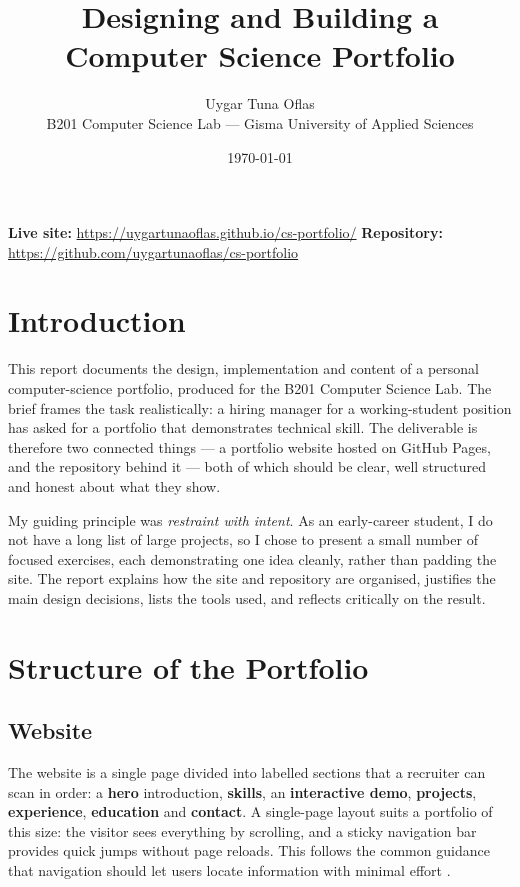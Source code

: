 \documentclass[11pt,a4paper]{article}
\title{\vspace{-1.2cm}\textbf{Designing and Building a Computer Science Portfolio}}
\author{Uygar Tuna Oflas \\ \small B201 Computer Science Lab — Gisma University of Applied Sciences}
\date{\small\today}
\begin{document}
\maketitle
\vspace{-0.6cm}

\begin{center}\small
\textbf{Live site:} \url{https://uygartunaoflas.github.io/cs-portfolio/} \quad\textbar\quad
\textbf{Repository:} \url{https://github.com/uygartunaoflas/cs-portfolio}
\end{center}
\vspace{0.2cm}

\section{Introduction}
This report documents the design, implementation and content of a personal
computer-science portfolio, produced for the B201 Computer Science Lab. The brief
frames the task realistically: a hiring manager for a working-student position has
asked for a portfolio that demonstrates technical skill. The deliverable is therefore
two connected things --- a portfolio website hosted on GitHub Pages, and the
repository behind it --- both of which should be clear, well structured and honest
about what they show.

My guiding principle was \emph{restraint with intent}. As an early-career student, I
do not have a long list of large projects, so I chose to present a small number of
focused exercises, each demonstrating one idea cleanly, rather than padding the site.
The report explains how the site and repository are organised, justifies the main
design decisions, lists the tools used, and reflects critically on the result.

\section{Structure of the Portfolio}

\subsection{Website}
The website is a single page divided into labelled sections that a recruiter can scan
in order: a \textbf{hero} introduction, \textbf{skills}, an \textbf{interactive demo},
\textbf{projects}, \textbf{experience}, \textbf{education} and \textbf{contact}. A
single-page layout suits a portfolio of this size: the visitor sees everything by
scrolling, and a sticky navigation bar provides quick jumps without page reloads. This
follows the common guidance that navigation should let users locate information with
minimal effort \citep{nielsen2020}.
\end{document}

